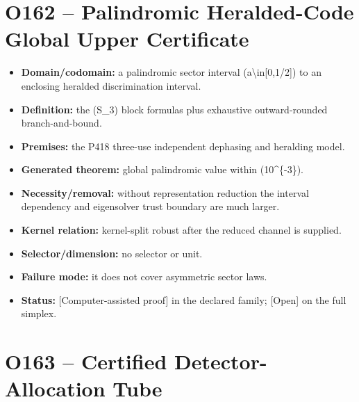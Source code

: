 \documentclass[11pt,a4paper,openany]{report}
\begin{document}
\section{O162 -- Palindromic Heralded-Code Global Upper Certificate}

\begin{itemize}
\item 
\textbf{Domain/\allowbreak{}codomain:} a palindromic sector interval (a\textbackslash{}in[0,1/\allowbreak{}2]) to an enclosing heralded discrimination interval.

\item 
\textbf{Definition:} the (S\_3) block formulas plus exhaustive outward-rounded branch-and-bound.

\item 
\textbf{Premises:} the P418 three-use independent dephasing and heralding model.

\item 
\textbf{Generated theorem:} global palindromic value within (10\textasciicircum{}\{-3\}).

\item 
\textbf{Necessity/\allowbreak{}removal:} without representation reduction the interval dependency and eigensolver trust boundary are much larger.

\item 
\textbf{Kernel relation:} kernel-split robust after the reduced channel is supplied.

\item 
\textbf{Selector/\allowbreak{}dimension:} no selector or unit.

\item 
\textbf{Failure mode:} it does not cover asymmetric sector laws.

\item 
\textbf{Status:} \textcolor{fingreen}{[Computer-assisted proof]} in the declared family; \textcolor{finorange}{[Open]} on the full simplex.

\end{itemize}

\section{O163 -- Certified Detector-Allocation Tube}
\end{document}
